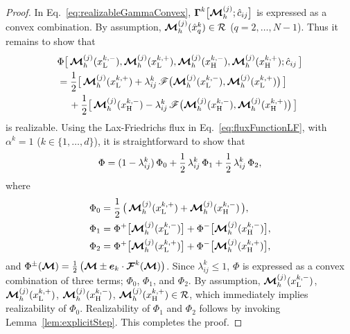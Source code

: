 \begin{proof}
  In Eq.~\eqref{eq:realizableGammaConvex}, $\boldsymbol{\Gamma}^{k}\big[\boldsymbol{\mathcal{M}}_{h}^{(j)};\hat{c}_{ij}\big]$ is expressed as a convex combination.  
  By assumption, $\boldsymbol{\mathcal{M}}_{h}^{(j)}(\hat{x}_{q}^{k})\in\mathcal{R}$ ($q=2,\ldots,N-1$).  
  Thus it remains to show that
  \begin{align*}
    &\Phi\big[\,\boldsymbol{\mathcal{M}}_{h}^{(j)}(x_{{\rm L}}^{k,-}),\boldsymbol{\mathcal{M}}_{h}^{(j)}(x_{{\rm L}}^{k,+}),\boldsymbol{\mathcal{M}}_{h}^{(j)}(x_{{\rm H}}^{k,-}),\boldsymbol{\mathcal{M}}_{h}^{(j)}(x_{{\rm H}}^{k,+});\hat{c}_{ij}\,\big] \\
    &=\frac{1}{2}\big[\,\boldsymbol{\mathcal{M}}_{h}^{(j)}(x_{{\rm L}}^{k,+})+\lambda_{ij}^{k}\,\mathscr{F}\big(\boldsymbol{\mathcal{M}}_{h}^{(j)}(x_{{\rm L}}^{k,-}),\boldsymbol{\mathcal{M}}_{h}^{(j)}(x_{{\rm L}}^{k,+})\big)\,\big] \\
    &\hspace{12pt}
    +\frac{1}{2}\big[\,\boldsymbol{\mathcal{M}}_{h}^{(j)}(x_{{\rm H}}^{k,-})-\lambda_{ij}^{k}\,\mathscr{F}\big(\boldsymbol{\mathcal{M}}_{h}^{(j)}(x_{{\rm H}}^{k,-}),\boldsymbol{\mathcal{M}}_{h}^{(j)}(x_{{\rm H}}^{k,+})\big)\,\big]
  \end{align*}
  is realizable.  
  Using the Lax-Friedrichs flux in Eq.~\eqref{eq:fluxFunctionLF}, with $\alpha^{k}=1$ ($k\in\{1,\ldots,d\}$), it is straightforward to show that
  \begin{equation}
    \Phi=(1-\lambda_{ij}^{k})\,\Phi_{0} + \frac{1}{2}\,\lambda_{ij}^{k}\,\Phi_{1} + \frac{1}{2}\,\lambda_{ij}^{k}\,\Phi_{2},
    \label{eq:phiConvex}
  \end{equation}
  where
  \begin{align*}
    \Phi_{0} &= \frac{1}{2}\,\big(\,\boldsymbol{\mathcal{M}}_{h}^{(j)}(x_{{\rm L}}^{k,+})+\boldsymbol{\mathcal{M}}_{h}^{(j)}(x_{{\rm H}}^{k,-})\,\big), \\
    \Phi_{1} &= \Phi^{+}\big[\boldsymbol{\mathcal{M}}_{h}^{(j)}(x_{{\rm L}}^{k,-})\big]+\Phi^{-}\big[\boldsymbol{\mathcal{M}}_{h}^{(j)}(x_{{\rm H}}^{k,-})\big], \\
    \Phi_{2} &= \Phi^{+}\big[\boldsymbol{\mathcal{M}}_{h}^{(j)}(x_{{\rm L}}^{k,+})\big]+\Phi^{-}\big[\boldsymbol{\mathcal{M}}_{h}^{(j)}(x_{{\rm H}}^{k,+})\big],
  \end{align*}
  and $\Phi^{\pm}(\boldsymbol{\mathcal{M}})=\frac{1}{2}\,\big(\boldsymbol{\mathcal{M}}\pm\boldsymbol{e}_{k}\cdot\boldsymbol{\mathcal{F}}^{k}(\boldsymbol{\mathcal{M}})\big)$.  
  Since $\lambda_{ij}^{k}\le1$, $\Phi$ is expressed as a convex combination of three terms; $\Phi_{0}$, $\Phi_{1}$, and $\Phi_{2}$.  
  By assumption, $\boldsymbol{\mathcal{M}}_{h}^{(j)}(x_{{\rm L}}^{k,-})$, $\boldsymbol{\mathcal{M}}_{h}^{(j)}(x_{{\rm L}}^{k,+})$, $\boldsymbol{\mathcal{M}}_{h}^{(j)}(x_{{\rm H}}^{k,-})$, $\boldsymbol{\mathcal{M}}_{h}^{(j)}(x_{{\rm H}}^{k,+})\in\mathcal{R}$, which immediately implies realizability of $\Phi_{0}$.  
  Realizability of $\Phi_{1}$ and $\Phi_{2}$ follows by invoking Lemma~\ref{lem:explicitStep}.  
  This completes the proof.  
\end{proof}


